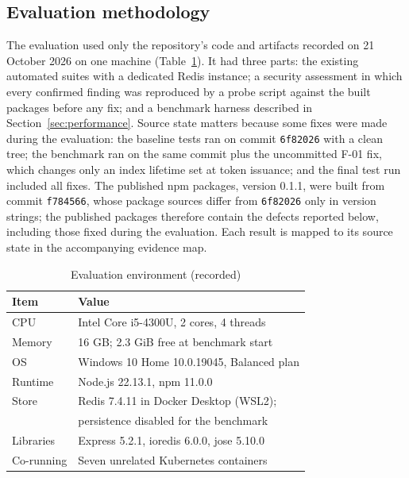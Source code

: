 \documentclass[conference]{IEEEtran}
\begin{document}
\subsection{Evaluation methodology}
The evaluation used only the repository's code and artifacts recorded on 21 October 2026 on one machine (Table~\ref{tab:env}). It had three parts: the existing automated suites with a dedicated Redis instance; a security assessment in which every confirmed finding was reproduced by a probe script against the built packages before any fix; and a benchmark harness described in Section~\ref{sec:performance}. Source state matters because some fixes were made during the evaluation: the baseline tests ran on commit \texttt{6f82026} with a clean tree; the benchmark ran on the same commit plus the uncommitted F-01 fix, which changes only an index lifetime set at token issuance; and the final test run included all fixes. The published npm packages, version 0.1.1, were built from commit \texttt{f784566}, whose package sources differ from \texttt{6f82026} only in version strings; the published packages therefore contain the defects reported below, including those fixed during the evaluation. Each result is mapped to its source state in the accompanying evidence map.

\begin{table}[htbp]
\caption{Evaluation environment (recorded)}
\begin{center}
\begin{tabular}{|l|l|}
\hline
\textbf{Item} & \textbf{Value} \\
\hline
CPU & Intel Core i5-4300U, 2 cores, 4 threads \\
Memory & 16 GB; 2.3 GiB free at benchmark start \\
OS & Windows 10 Home 10.0.19045, Balanced plan \\
Runtime & Node.js 22.13.1, npm 11.0.0 \\
Store & Redis 7.4.11 in Docker Desktop (WSL2); \\
 & persistence disabled for the benchmark \\
Libraries & Express 5.2.1, ioredis 6.0.0, jose 5.10.0 \\
Co-running & Seven unrelated Kubernetes containers \\
\hline
\end{tabular}
\label{tab:env}
\end{center}
\end{table}

\end{document}
